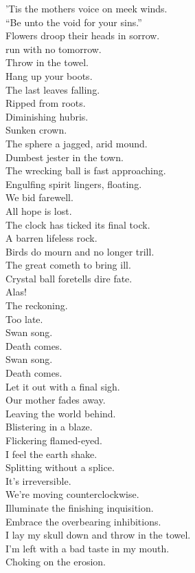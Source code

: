 'Tis the mothers voice on meek winds. \\
``Be unto the void for your sins.'' \\
Flowers droop their heads in sorrow. \\
 run with no tomorrow. \\

Throw in the towel. \\
Hang up your boots. \\
The last leaves falling. \\
Ripped from roots. \\
Diminishing hubris. \\
Sunken crown. \\
The sphere a jagged, arid mound. \\
Dumbest jester in the town. \\
The wrecking ball is fast approaching. \\
Engulfing spirit lingers, floating. \\
We bid farewell. \\
All hope is lost. \\
The clock has ticked its final tock. \\
A barren lifeless rock. \\

Birds do mourn and no longer trill. \\
The great  cometh to bring ill. \\
Crystal ball foretells dire fate. \\
Alas! \\
The reckoning. \\
Too late. \\

Swan song. \\
Death comes. \\
Swan song. \\
Death comes. \\

Let it out with a final sigh. \\
Our mother fades away. \\
Leaving the world behind. \\
Blistering in a blaze. \\
Flickering flamed-eyed. \\
I feel the earth shake. \\
Splitting without a splice. \\
It's irreversible. \\
We're moving counterclockwise. \\
Illuminate the finishing inquisition. \\
Embrace the overbearing inhibitions. \\
I lay my skull down and throw in the towel. \\
I'm left with a bad taste in my mouth. \\
Choking on the  erosion. \\


